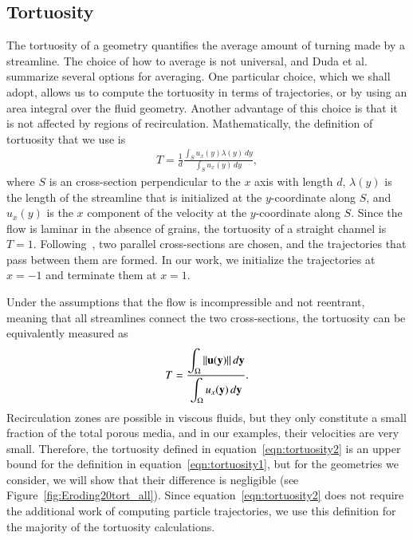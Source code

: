 \documentclass[preprint, 10pt]{elsarticle}
\begin{document}
\subsection{Tortuosity}
The tortuosity of a geometry quantifies the average amount of turning
made by a streamline.  The choice of how to average is not universal,
and Duda et al.~\cite{dud-koz-mat2011} summarize several options for
averaging.  One particular choice, which we shall adopt, allows us to
compute the tortuosity in terms of trajectories, or by using an area
integral over the fluid geometry.  Another advantage of this choice is
that it is not affected by regions of recirculation.  Mathematically,
the definition of tortuosity that we use is
\begin{align}
  T = \frac{1}{d}\frac{\displaystyle\int_{S}u_x(y)\lambda(y)\,dy}
  {\displaystyle\int_{S}u_x(y)\,dy},
  \label{eqn:tortuosity1}
\end{align}
where $S$ is an cross-section perpendicular to the $x$ axis with length
$d$, $\lambda(y)$ is the length of the streamline that is initialized at
the $y$-coordinate along $S$, and $u_x(y)$ is the $x$ component of the
velocity at the $y$-coordinate along $S$.  Since the flow is laminar in
the absence of grains, the tortuosity of a straight channel is $T=1$.
Following~\cite{dud-koz-mat2011}, two parallel cross-sections are
chosen, and the trajectories that pass between them are formed.  In our
work, we initialize the trajectories at $x=-1$ and terminate them at
$x=1$.

Under the assumptions that the flow is incompressible and not reentrant,
meaning that all streamlines connect the two cross-sections, the
tortuosity can be equivalently measured as~\cite{dud-koz-mat2011}
\begin{align}
  T = \frac{\displaystyle\int_\Omega \|{\mathbf{u}}({\mathbf{y}})\|\, d{\mathbf{y}}}
           {\displaystyle\int_\Omega u_x({\mathbf{y}})\, d{\mathbf{y}}}.
  \label{eqn:tortuosity2}
\end{align}
Recirculation zones are possible in viscous fluids, but they only
constitute a small fraction of the total porous media, and in our
examples, their velocities are very small.  Therefore, the tortuosity
defined in equation~\eqref{eqn:tortuosity2} is an upper bound for the
definition in equation~\eqref{eqn:tortuosity1}, but for the geometries
we consider, we will show that their difference is negligible (see
Figure~\ref{fig:Eroding20tort_all}).  Since
equation~\eqref{eqn:tortuosity2} does not require the additional work of
computing particle trajectories, we use this definition for the
majority of the tortuosity calculations.
\end{document}
